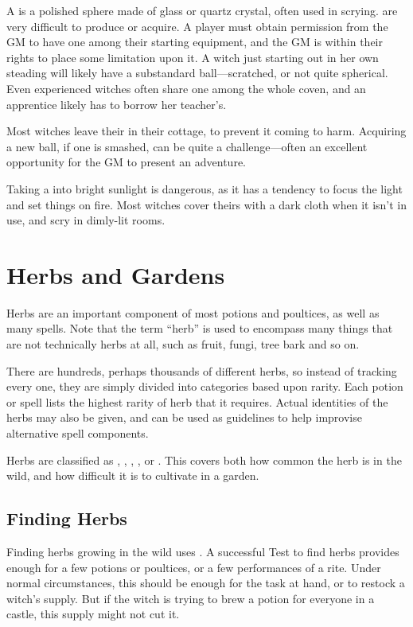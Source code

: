 A  is a polished sphere made of glass or quartz crystal, often used in scrying.
 are very difficult to produce or acquire.
A player must obtain permission from the GM to have one among their starting equipment, and the GM is within their rights to place some limitation upon it.
A witch just starting out in her own steading will likely have a substandard ball---scratched, or not quite spherical.
Even experienced witches often share one among the whole coven, and an apprentice likely has to borrow her teacher's.

Most witches leave their  in their cottage, to prevent it coming to harm.
Acquiring a new ball, if one is smashed, can be quite a challenge---often an excellent opportunity for the GM to present an adventure.

Taking a  into bright sunlight is dangerous, as it has a tendency to focus the light and set things on fire.
Most witches cover theirs with a dark cloth when it isn't in use, and scry in dimly-lit rooms.


\section{Herbs and Gardens}

Herbs are an important component of most potions and poultices, as well as many spells.
Note that the term ``herb'' is used to encompass many things that are not technically herbs at all, such as fruit, fungi, tree bark and so on.

There are hundreds, perhaps thousands of different herbs, so instead of tracking every one, they are simply divided into categories based upon rarity.
Each potion or spell lists the highest rarity of herb that it requires.
Actual identities of the herbs may also be given, and can be used as guidelines to help improvise alternative spell components.

Herbs are classified as , , , , or .
This covers both how common the herb is in the wild, and how difficult it is to cultivate in a garden.

\subsection{Finding Herbs}

Finding herbs growing in the wild uses .
A successful Test to find herbs provides enough for a few potions or poultices, or a few performances of a rite.
Under normal circumstances, this should be enough for the task at hand, or to restock a witch's supply.
But if the witch is trying to brew a potion for everyone in a castle, this supply might not cut it.

